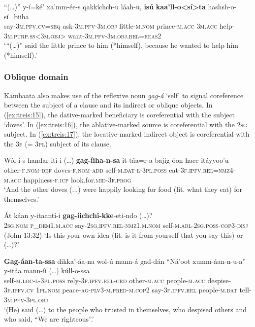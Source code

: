 \documentclass[output=paper]{langscibook}
\begin{document}
\ea\label{ex:treis:14} 
\gll “(…)” y-í=ké’ xa’mm-ée-s qakkíchch-u láah-u, \textbf{isú} \textbf{kaa’ll-o<sí>ta} hashsh-o-sí=biiha\\
     {} say-\textsc{3m.pfv.cv=seq} ask-\textsc{3m.pfv-3m.obj} little-\textsc{m.nom} prince-\textsc{m.acc} \textsc{3m.acc} help-\textsc{3m.purp.ss<3m.obj>} want-\textsc{3m.pfv-3m.obj.rel=reas2}\\
\glt ‘“(…)” said the little prince to him (*himself), because he wanted to help him (*himself).’ \citep[44]{Saint-Exupéry2018}\z

\subsubsection{Oblique domain}\label{sec:treis:3.2.2}

Kambaata also makes use of the reflexive noun \textit{gag-á} ‘self’ to signal coreference between the subject of a clause and its indirect or oblique objects. In (\ref{ex:treis:15}), the dative-marked beneficiary is coreferential with the subject ‘doves’. In (\ref{ex:treis:16}), the ablative-marked source is coreferential with the \textsc{2sg} subject. In (\ref{ex:treis:17}), the locative-marked indirect object is coreferential with the \textsc{3f} \textsc{(=} \textsc{3pl)} subject of its clause. 

\ea\label{ex:treis:15}
\gll Wól-i-s handar-ití-i (…) \textbf{gag-íiha-n-sa} it-táa=r-a bajig-óon hacc-itáyyoo’u \\
     other-\textsc{f.nom-def} doves-\textsc{f.nom-add} {} self-\textsc{m.dat-l-3pl.poss} eat-\textsc{3f.ipfv.rel=nmz4-m.acc} happiness-\textsc{f.icp} look.for.\textsc{mid-3f.prog}\\
\glt ‘And the other doves (...) were happily looking for food (lit. what they eat) for themselves.’ \citep[8.19f]{KEB1989}\z

\ea\label{ex:treis:16} 
\gll Át káan y-itaantí-i {\textbf{gag-íichchi-kke}-eti-ndo (…)}?\\
     \textsc{2sg.nom} \textsc{p\_dem1.m.acc} say-\textsc{2sg.ipfv.rel-nmz1.m.nom} self-\textsc{m.abl-2sg.poss-cop3-disj}\\
\glt (John 13:32) ‘Is this your own idea (lit. is it from yourself that you say this) or (…)?’ \citep[83]{KHTPH2005}\z

\ea\label{ex:treis:17} 
\gll \textbf{Gag-áan-ta-ssa} dikka’-áa-na wol-ú mann-á gad-dán “Ná’oot xumm-áan-n-u-a” y-itáa mann-íi (…) kúll-o-ssa\\
     self-\textsc{m.loc-l-3pl.poss} rely-\textsc{3f.ipfv.rel-crd} other-\textsc{m.acc} people-\textsc{m.acc} despise-\textsc{3f.ipfv.cv} {\db}\textsc{1pl.nom} peace-\textsc{ag-plv3-m.pred-m.cop2} say-\textsc{3f.ipfv.rel} people-\textsc{m.dat} {} tell-\textsc{3m.pfv-3pl.obj}\\
\glt ‘(He) said (…) to the people who trusted in themselves, who despised others and who said, “We are righteous”.’ \citep[16]{BSENodate}\z
\end{document}
